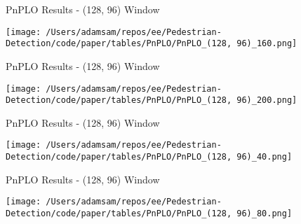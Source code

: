 \begin{table}
    \caption{PnPLO Results - (128, 96) Window}
    \texttt{[image: /Users/adamsam/repos/ee/Pedestrian-Detection/code/paper/tables/PnPLO/PnPLO\_(128, 96)\_160.png]}
    \label{tab:PnPLO_(128, 96)_160}
\end{table}

\begin{table}
    \caption{PnPLO Results - (128, 96) Window}
    \texttt{[image: /Users/adamsam/repos/ee/Pedestrian-Detection/code/paper/tables/PnPLO/PnPLO\_(128, 96)\_200.png]}
    \label{tab:PnPLO_(128, 96)_200}
\end{table}

\begin{table}
    \caption{PnPLO Results - (128, 96) Window}
    \texttt{[image: /Users/adamsam/repos/ee/Pedestrian-Detection/code/paper/tables/PnPLO/PnPLO\_(128, 96)\_40.png]}
    \label{tab:PnPLO_(128, 96)_40}
\end{table}

\begin{table}
    \caption{PnPLO Results - (128, 96) Window}
    \texttt{[image: /Users/adamsam/repos/ee/Pedestrian-Detection/code/paper/tables/PnPLO/PnPLO\_(128, 96)\_80.png]}
    \label{tab:PnPLO_(128, 96)_80}
\end{table}
